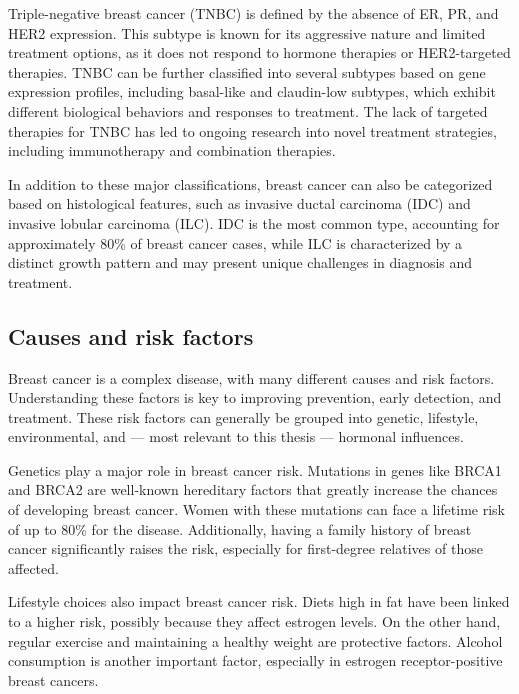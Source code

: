 Triple-negative breast cancer (TNBC) is defined by the absence of ER, PR, and
HER2 expression.
This subtype is known for its aggressive nature and limited treatment options,
as it does not respond to hormone therapies or HER2-targeted
therapies\supercite{sizemore_triple_2021}.
TNBC can be further classified into several subtypes based on gene expression
profiles, including basal-like and claudin-low subtypes, which exhibit
different biological behaviors and responses to
treatment\supercite{lehmann_identification_2011}.
The lack of targeted therapies for TNBC has led to ongoing research into novel
treatment strategies, including immunotherapy and combination
therapies\supercite{lehmann_identification_2011}.

In addition to these major classifications, breast cancer can also be
categorized based on histological features, such as invasive ductal carcinoma
(IDC) and invasive lobular carcinoma (ILC).
IDC is the most common type, accounting for approximately 80\% of breast cancer
cases, while ILC is characterized by a distinct growth pattern and may present
unique challenges in diagnosis and
treatment\supercite{mittal_molecular_nodate}.

\subsection{Causes and risk factors}

Breast cancer is a complex disease, with many different causes and risk
factors.
Understanding these factors is key to improving prevention, early detection,
and treatment.
These risk factors can generally be grouped into genetic, lifestyle,
environmental, and — most relevant to this thesis — hormonal influences.

Genetics play a major role in breast cancer risk.
Mutations in genes like BRCA1 and BRCA2 are well-known hereditary factors that
greatly increase the chances of developing breast cancer.
Women with these mutations can face a lifetime risk of up to 80\% for the
disease\supercite{jian_clinical_2017}.
Additionally, having a family history of breast cancer significantly raises the
risk, especially for first-degree relatives of those
affected\supercite{schairer_risk_2013}.

Lifestyle choices also impact breast cancer risk.
Diets high in fat have been linked to a higher risk, possibly because they
affect estrogen levels\supercite{turner_meta-analysis_2011}.
On the other hand, regular exercise and maintaining a healthy weight are
protective factors\supercite{claudia_admoun_etiology_2022}.
Alcohol consumption is another important factor, especially in estrogen
receptor-positive breast cancers\supercite{bao_association_2011}.

